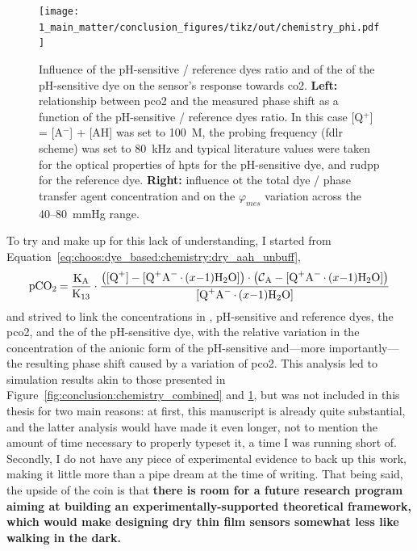 \begin{figure} %
	\centering
	\texttt{[image: 1\_main\_matter/conclusion\_figures/tikz/out/chemistry\_phi.pdf]}
	\caption[Influence of the \pKa{} and dyes ratio on the sensor's response towards \gls{co2}.]{Influence of the pH-sensitive / reference dyes ratio and of the \pKa{} of the pH-sensitive dye on the sensor's response towards \gls{co2}. \textbf{Left:} relationship between \gls{pco2} and the measured phase shift as a function of the pH-sensitive / reference dyes ratio. In this case [Q$^+$] = [A$^-$] + [AH] was set to 100~\textmu{}M, the probing frequency (\gls{fdlr} scheme) was set to 80~kHz and typical literature values were taken for the optical properties of \gls{hpts} for the pH-sensitive dye, and \gls{rudpp} for the reference dye. \textbf{Right:} influence ot the total dye / phase transfer agent concentration and \pKa{} on the $\varphi_{mes}$ variation across the 40--80~mmHg range.}
	\label{fig:conclusion:chemistry_phi}
\end{figure}

To try and make up for this lack of understanding, I started from Equation~\ref{eq:choos:dye_based:chemistry:dry_aah_unbuff}, \ie{}
\begin{equation}
	\ce{pCO_2 = \frac{K_A}{K_{13}}}\cdot \frac{\left(\ce{[Q^+] - [Q^+A^-.$(x-1)$H_2O]}\right)\cdot\left(\ce{\mathcal{C}_A - [Q^+A^-.$(x-1)$H_2O]}\right)}{\ce{[Q^+A^-.$(x-1)$H_2O]}}
\end{equation}
and strived to link the concentrations in , pH-sensitive and reference dyes, the \gls{pco2}, and the \pKa{} of the pH-sensitive dye, with the relative variation in the concentration of the anionic form of the pH-sensitive and---more importantly---the resulting phase shift caused by a variation of \gls{pco2}. This analysis led to simulation results akin to those presented in Figure~\ref{fig:conclusion:chemistry_combined} and \ref{fig:conclusion:chemistry_phi}, but was not included in this thesis for two main reasons: at first, this manuscript is already quite substantial, and the latter analysis would have made it even longer, not to mention the amount of time necessary to properly typeset it, a time I was running short of. Secondly, I do not have any piece of experimental evidence to back up this work, making it little more than a pipe dream at the time of writing. That being said, the upside of the coin is that \textbf{there is room for a future research program aiming at building an experimentally-supported theoretical framework, which would make designing dry thin film sensors somewhat less like walking in the dark.}

